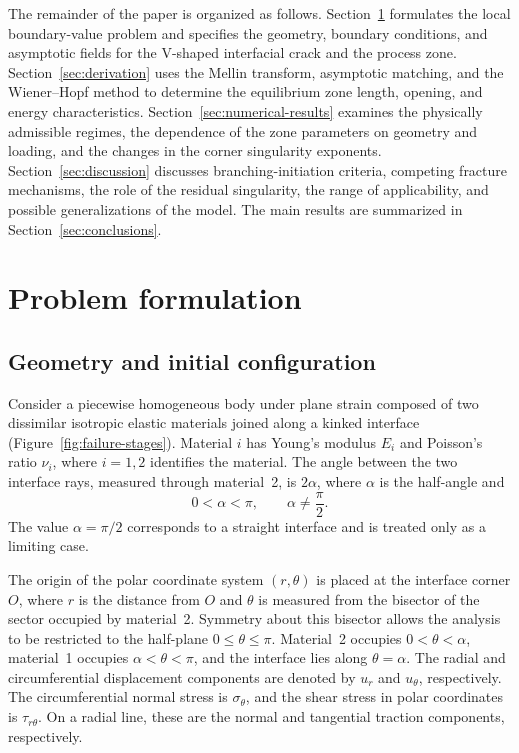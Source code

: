 \documentclass[pdflatex,onecolumn,sn-mathphys-ay]{sn-jnl}
\begin{document}
The remainder of the paper is organized as follows. Section~\ref{sec:problem}
formulates the local boundary-value problem and specifies the geometry,
boundary conditions, and asymptotic fields for the V-shaped interfacial crack
and the process zone. Section~\ref{sec:derivation} uses the Mellin transform,
asymptotic matching, and the Wiener--Hopf method to determine the equilibrium
zone length, opening, and energy characteristics. Section~\ref{sec:numerical-results}
examines the physically admissible regimes, the dependence of the zone
parameters on geometry and loading, and the changes in the corner singularity
exponents. Section~\ref{sec:discussion} discusses branching-initiation
criteria, competing fracture mechanisms, the role of the residual
singularity, the range of applicability, and possible generalizations of the
model. The main results are summarized in Section~\ref{sec:conclusions}.


\section{Problem formulation}
\label{sec:problem}
\providecommand{\AsymptoticsAppendix}{Appendix~\ref{app:asymptotics}}

\subsection{Geometry and initial configuration}
\label{subsec:geometry}

Consider a piecewise homogeneous body under plane strain composed of two
dissimilar isotropic elastic materials joined along a kinked interface
(Figure~\ref{fig:failure-stages}).
Material $i$ has Young's modulus $E_i$ and Poisson's ratio $\nu_i$, where
$i=1,2$ identifies the material. The angle between the two interface rays,
measured through material~2, is $2\alpha$, where $\alpha$ is the half-angle and
\begin{equation*}
  0<\alpha<\pi, \qquad \alpha\ne\frac{\pi}{2}.
\end{equation*}
The value $\alpha=\pi/2$ corresponds to a straight interface and is treated
only as a limiting case.

The origin of the polar coordinate system $(r,\theta)$ is placed at the
interface corner $O$, where $r$ is the distance from $O$ and $\theta$ is
measured from the bisector of the sector occupied by material~2. Symmetry
about this bisector allows the analysis to be restricted to the half-plane
$0\leq\theta\leq\pi$. Material~2 occupies $0<\theta<\alpha$, material~1
occupies $\alpha<\theta<\pi$, and the interface lies along
$\theta=\alpha$. The radial and circumferential displacement components
are denoted by $u_r$ and $u_\theta$, respectively. The circumferential normal
stress is $\sigma_\theta$, and the shear stress in polar coordinates is
$\tau_{r\theta}$. On a radial line, these are the normal and tangential
traction components, respectively.
\end{document}
